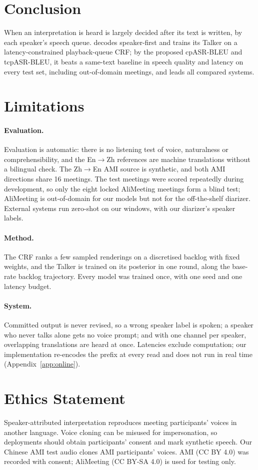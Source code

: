 \section{Conclusion}
\label{sec:conclusion}

When an interpretation is heard is largely decided after its text is written, by each speaker's speech queue.
\sys{} decodes speaker-first and trains its Talker on a latency-constrained playback-queue CRF; by the proposed
cpASR-BLEU and tcpASR-BLEU, it beats a same-text baseline in speech quality and latency on every test set,
including out-of-domain meetings, and leads all compared systems.

\section*{Limitations}
\label{sec:res-hygiene}

\paragraph{Evaluation.} Evaluation is automatic: there is no listening test of voice, naturalness or
comprehensibility, and the En$\rightarrow$Zh references are machine translations without a bilingual check. The
Zh$\rightarrow$En AMI source is synthetic, and both AMI directions share 16 meetings. The test meetings were scored
repeatedly during development, so only the eight locked AliMeeting meetings form a blind test; AliMeeting is
out-of-domain for our models but not for the off-the-shelf diarizer. External systems run zero-shot on our windows,
with our diarizer's speaker labels.

\paragraph{Method.} The CRF ranks a few sampled renderings on a discretised backlog with fixed weights, and the Talker
is trained on its posterior in one round, along the base-rate backlog trajectory. Every model was trained once, with
one seed and one latency budget.

\paragraph{System.} Committed output is never revised, so a wrong speaker label is spoken; a speaker who never talks
alone gets no voice prompt; and with one channel per speaker, overlapping translations are heard at once. Latencies
exclude computation; our implementation re-encodes the prefix at every read and does not run in real time
(Appendix~\ref{app:online}).

\section*{Ethics Statement}

Speaker-attributed interpretation reproduces meeting participants' voices in another language. Voice cloning can be
misused for impersonation, so deployments should obtain participants' consent and mark synthetic speech. Our Chinese AMI
test audio clones AMI participants' voices. AMI (CC BY 4.0) was recorded with consent; AliMeeting (CC BY-SA 4.0) is used
for testing only.
